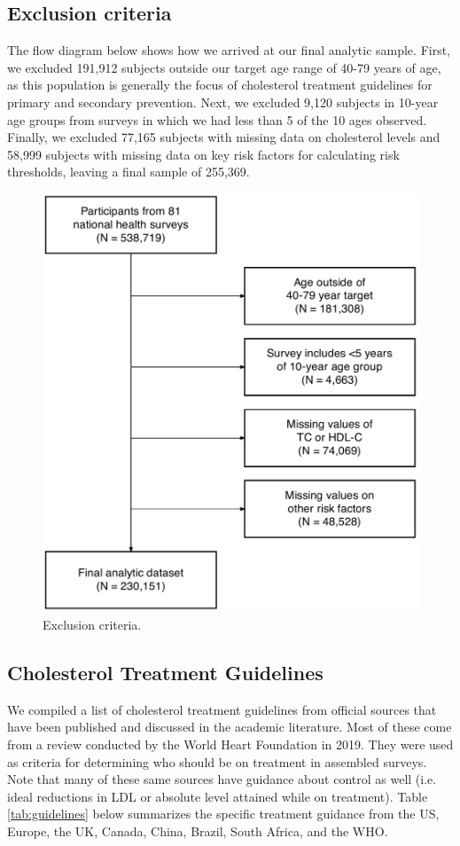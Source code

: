\documentclass[12pt]{article}
\begin{document}
\begin{appendix}
\begin{refsection}
    \subsection{Exclusion criteria}
    The flow diagram below shows how we arrived at our final analytic sample. First, we excluded 191,912 subjects outside our target age range of 40-79 years of age, as this population is generally the focus of cholesterol treatment guidelines for primary and secondary prevention. Next, we excluded 9,120 subjects in 10-year age groups from surveys in which we had less than 5 of the 10 ages observed. Finally, we excluded 77,165 subjects with missing data on cholesterol levels and 58,999 subjects with missing data on key risk factors for calculating risk thresholds, leaving a final sample of 255,369.
    \begin{figure}[H]
        \centering
        \includegraphics[width=0.5\linewidth]{../3_figures/figS_STROBE.pdf}
        \caption{Exclusion criteria.}
        \label{fig:exclusion}
    \end{figure}

    \subsection{Cholesterol Treatment Guidelines}

    We compiled a list of cholesterol treatment guidelines from official sources that have been published and discussed in the academic literature. Most of these come from a review conducted by the World Heart Foundation in 2019. They were used as criteria for determining who should be on treatment in assembled surveys. Note that many of these same sources have guidance about control as well (i.e. ideal reductions in LDL or absolute level attained while on treatment). Table \ref{tab:guidelines} below summarizes the specific treatment guidance from the US, Europe, the UK, Canada, China, Brazil, South Africa, and the WHO. 


\end{refsection}
\end{appendix}
\end{document}
